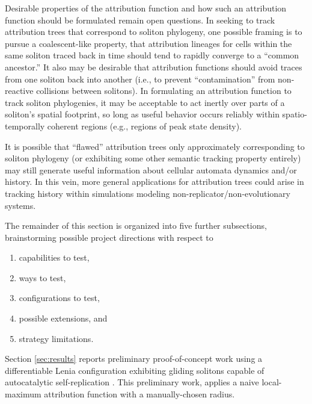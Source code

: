 Desirable properties of the attribution function and how such an attribution function should be formulated remain open questions.
In seeking to track attribution trees that correspond to soliton phylogeny, one possible framing is to pursue a coalescent-like property, that attribution lineages for cells within the same soliton traced back in time should tend to rapidly converge to a ``common ancestor.''
It also may be desirable that attribution functions should avoid traces from one soliton back into another (i.e., to prevent ``contamination'' from non-reactive collisions between solitons).
In formulating an attribution function to track soliton phylogenies, it may be acceptable to act inertly over parts of a soliton's spatial footprint, so long as useful behavior occurs reliably within spatio-temporally coherent regions (e.g., regions of peak state density).

It is possible that ``flawed'' attribution trees only approximately corresponding to soliton phylogeny (or exhibiting some other semantic tracking property entirely) may still generate useful information about cellular automata dynamics and/or history.
In this vein, more general applications for attribution trees could arise in tracking history within simulations modeling non-replicator/non-evolutionary systems.

The remainder of this section is organized into five further subsections, brainstorming possible project directions with respect to
\begin{enumerate}
\item capabilities to test,
\item ways to test,
\item configurations to test,
\item possible extensions, and
\item strategy limitations.
\end{enumerate}

Section \ref{sec:results} reports preliminary proof-of-concept work using a differentiable Lenia configuration exhibiting gliding solitons capable of autocatalytic self-replication \citep{hamon2022learning}.
This preliminary work, applies a naive local-maximum attribution function with a manually-chosen radius.

